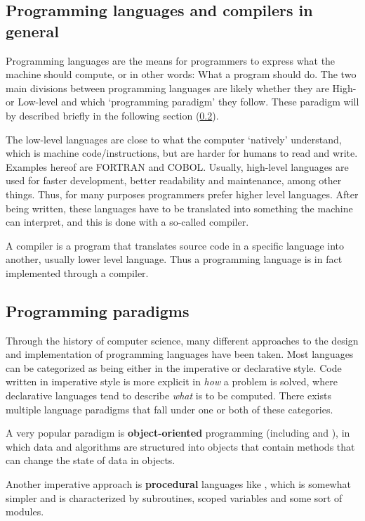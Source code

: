 
\subsection{Programming languages and compilers in general}
Programming languages are the means for programmers to express what the machine should compute, or in other words: What a program should do.
The two main divisions between programming languages are likely whether they are High- or Low-level and which `programming paradigm' they follow. These paradigm will by described briefly in the following section (\ref{sec:paradigms}).

The low-level languages are close to what the computer `natively' understand, which is machine code/instructions, but are harder for humans to read and write. Examples hereof are FORTRAN and COBOL. Usually, high-level languages are used for faster development, better readability and maintenance, among other things. Thus, for many purposes programmers prefer higher level languages. After being written, these languages have to be translated into something the machine can interpret, and this is done with a so-called compiler.

A compiler is a program that translates source code in a specific language into another, usually lower level language. Thus a programming language is in fact implemented through a compiler.

\subsection{Programming paradigms}
\label{sec:paradigms}
Through the history of computer science, many different approaches to the design and implementation of programming languages have been taken. Most languages can be categorized as being either in the imperative or declarative style. Code written in imperative style is more explicit in \emph{how} a problem is solved, where declarative languages tend to describe \emph{what} is to be computed. There exists multiple language paradigms that fall under one or both of these categories.

A very popular paradigm is \textbf{object-oriented} programming (including  and ), in which data and algorithms are structured into objects that contain methods that can change the state of data in objects.

Another imperative approach is \textbf{procedural} languages like , which is somewhat simpler and is characterized by subroutines, scoped variables and some sort of modules.

